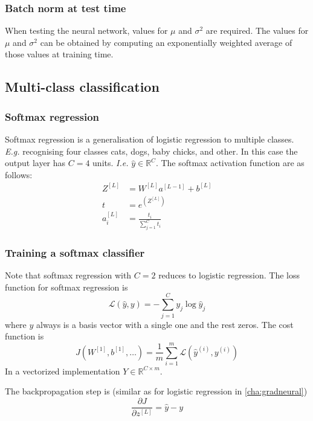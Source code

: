 \documentclass{article}
\begin{document}
\subsubsection{Batch norm at test time}
When testing the neural network, values for $\mu$ and $\sigma^2$ are required.
The values for $\mu$ and $\sigma^2$ can be obtained by computing an exponentially weighted average
of those values at training time.

\subsection{Multi-class classification}
\subsubsection{Softmax regression}
Softmax regression is a generalisation of logistic regression to multiple classes.
\emph{E.g.} recognising four classes cats, dogs, baby chicks, and other.
In this case the output layer has $C=4$ units.
\emph{I.e.} $\hat{y}\in\mathbb{R}^C$.
The softmax activation function are as follows:
\begin{equation}
  \begin{split}
    Z^{[L]}&=W^{[L]}a^{[L-1]}+b^{[L]}\\
    t&=e^{(Z^{[L]})}\\
    a_i^{[L]}&=\frac{t_i}{\sum_{j=1}^C t_i}
  \end{split}
\end{equation}

\subsubsection{Training a softmax classifier}
Note that softmax regression with $C=2$ reduces to logistic regression.
The loss function for softmax regression is
\begin{equation}
  \mathcal{L}(\hat{y},y)=-\sum_{j=1}^C y_j\log\hat{y}_j
\end{equation}
where $y$ always is a basis vector with a single one and the rest zeros.
The cost function is
\begin{equation}
  J(W^{[1]},b^{[1]},\ldots)=\frac{1}{m}\sum_{i=1}^m\mathcal{L}(\hat{y}^{(i)},y^{(i)})
\end{equation}
In a vectorized implementation $Y\in\mathbb{R}^{C\times m}$.

The backpropagation step is (similar as for logistic regression in \cref{cha:gradneural})
\begin{equation}
  \frac{\partial J}{\partial z^{[L]}}=\hat{y}-y
\end{equation}
\end{document}
